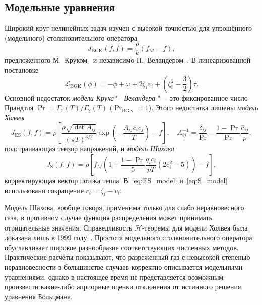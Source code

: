 \subsection{Модельные уравнения}

Широкий круг нелинейных задач изучен с высокой точностью для упрощённого (модельного) столкновительного оператора
\begin{equation}\label{eq:BGK}
    J_\mathrm{BGK}(f,f) = \frac{\rho}{k} (f_M-f),
\end{equation}
предложенного М.~Круком~\autocite{Krook1954} и независимо П.~Веландером~\autocite{Welander1954}.
В линеаризованной постановке
\begin{equation}\label{eq:linear_BGK}
    \mathcal{L}_\mathrm{BGK}(\phi) = -\phi + \omega + 2\zeta_i v_i + \left( \zeta_i^2 - \frac32 \right)\tau.
\end{equation}
Основной недостаток \emph{модели Крука"--~Веландера} "--- это фиксированное число Прандтля
\(\Pr = \Gamma_1(T)/\Gamma_2(T)\) (\(\Pr_\mathrm{BGK}=1\)).
Этого недостатка лишены \emph{модель Холвея}~\cite{Holway1966}
\begin{equation}\label{eq:ES_model}
    J_\mathrm{ES}(f,f) = \rho \left[\frac{\rho\sqrt{\det A_{ij}}}{(\pi T)^{3/2}}
        \exp\left(- \frac{A_{ij}c_i c_j}T \right) -f \right], \quad
    A_{ij}^{-1} = \frac{\delta_{ij}}{\Pr} - \frac{1-\Pr}{\Pr}\frac{p_{ij}}{p},
\end{equation}
подстраивающая тензор напряжений, и \emph{модель Шахова}~\cite{Shakhov1968}
\begin{equation}\label{eq:S_model}
    J_\mathrm{S}(f,f) = \rho \left[ f_M \left( 1+\frac{1-\Pr}{5}\frac{q_i c_i}{pT}
        \left(2c_i^2-5\right) \right)-f\right],
\end{equation}
корректирующая вектор потока тепла.
В~\eqref{eq:ES_model} и~\eqref{eq:S_model} использовано сокращение \(c_i = \zeta_i-v_i\).

Модель Шахова, вообще говоря, применима только для слабо неравновесного газа,
в противном случае функция распределения может принимать отрицательные значения.
Справедливость \(\mathcal{H}\)-теоремы для модели Холвея была доказана лишь в 1999 году~\cite{Perthame2000}.
Простота модельного столкновительного оператора обуславливает широкое разнообразие соответствующих численных методов.
Практические расчёты показывают, что разреженный газ с невысокой степенью неравновесности в большинстве случаев
корректно описывается модельными уравнениями, однако в настоящее время не представляется возможным произвести какие-либо
априорные оценки отклонения от истинного решения уравнения Больцмана.

